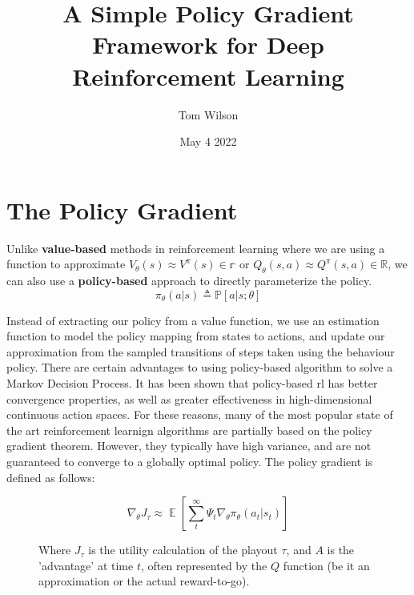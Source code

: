 \documentclass[11pt]{report}
\title{A Simple Policy Gradient Framework for Deep Reinforcement Learning}
\author{Tom Wilson}
\date{May 4 2022}
\newcommand{\capteq}[2]{
	\begin{figure}[h!]
		\[
			#1
		\]
		\caption{#2}
	\end{figure}
}
\begin{document}
\maketitle


\section*{The Policy Gradient}
	\par Unlike \textbf{value-based} methods in reinforcement learning where we are using a function to approximate $V_\theta(s) \approx V^\pi(s) \in \mathbb{r}$ or $Q_\theta(s, a) \approx Q^\pi(s, a) \in \mathbb{R}$, we can also use a \textbf{policy-based} approach to directly parameterize the policy.
	\[ \pi_\theta(a|s) \triangleq \mathbb{P}[a|s; \theta]\]
	 \par Instead of extracting our policy from a value function, we use an estimation function to model the policy mapping from states to actions, and update our approximation from the sampled transitions of steps taken using the behaviour policy. There are certain advantages to using policy-based algorithm to solve a Markov Decision Process. It has been shown that policy-based rl has better convergence properties, as well as greater effectiveness in high-dimensional continuous action spaces. For these reasons, many of the most popular state of the art reinforcement learnign algorithms are partially based on the policy gradient theorem. However, they typically have high variance, and are not guaranteed to converge to a globally optimal policy. The policy gradient is defined as follows:
	 \capteq{
		 \nabla_\theta J_\tau \approx \mathop{\mathbb{E}}[\sum_{t}^{\infty}\Psi_t \nabla_\theta \pi_\theta(a_t|s_t)]
	 }{
		 Where $J_\tau$ is the utility calculation of the playout $\tau$, and $A$ is the 'advantage' at time $t$, often represented by the $Q$ function (be it an approximation or the actual reward-to-go).
	 }
\end{document}
